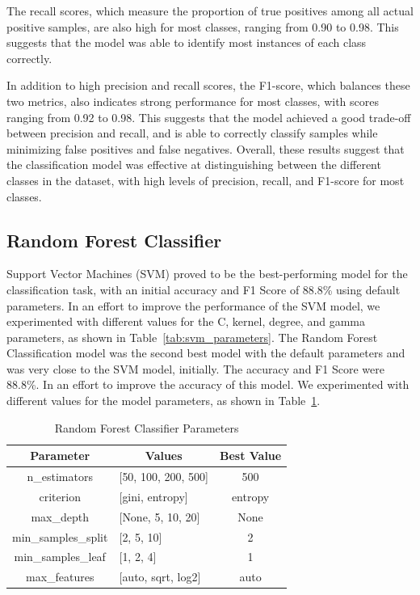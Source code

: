 \documentclass[conference]{IEEEtran}
\begin{document}
The recall scores, which measure the proportion of true positives among all actual positive samples, are also high for most classes, ranging from 0.90 to 0.98. This suggests that the model was able to identify most instances of each class correctly.

In addition to high precision and recall scores, the F1-score, which balances these two metrics, also indicates strong performance for most classes, with scores ranging from 0.92 to 0.98. This suggests that the model achieved a good trade-off between precision and recall, and is able to correctly classify samples while minimizing false positives and false negatives.
Overall, these results suggest that the classification model was effective at distinguishing between the different classes in the dataset, with high levels of precision, recall, and F1-score for most classes.

\subsection{Random Forest Classifier}
Support Vector Machines (SVM) proved to be the best-performing model for the classification task, with an initial accuracy and F1 Score of 88.8\% using default parameters. In an effort to improve the performance of the SVM model, we experimented with different values for the C, kernel, degree, and gamma parameters, as shown in Table~\ref{tab:svm_parameters}.
The Random Forest Classification model was the second best model with the default parameters and was very close to the SVM model, initially. 
The accuracy and F1 Score were 88.8\%. 
In an effort to improve the accuracy of this model. 
We experimented with different values for the model parameters, as shown in Table~\ref{tab:rf_parameters}.
\begin{table}[!h]
    \centering
    \label{tab:rf_parameters}
    \begin{tabular}{|c|l|c|}
    \hline
    \textbf{Parameter} & \multicolumn{1}{c|}{\textbf{Values}}     & \multicolumn{1}{l|}{\textbf{Best Value}} \\ \hline
    n\_estimators       & {[}50, 100, 200, 500{]}                  & 500                                      \\ \hline
    criterion          & {[}gini, entropy{]}                      & entropy                                  \\ \hline
    max\_depth          & {[}None, 5, 10, 20{]}                    & None                                     \\ \hline
    min\_samples\_split  & {[}2, 5, 10{]}                           & 2                                   \\ \hline
    min\_samples\_leaf   & {[}1, 2, 4{]}                            & 1                                 \\ \hline
    max\_features       & {[}auto, sqrt, log2{]}                   & auto                                    \\ \hline
    \end{tabular}
    \caption{Random Forest Classifier Parameters}
\end{table}
\end{document}
